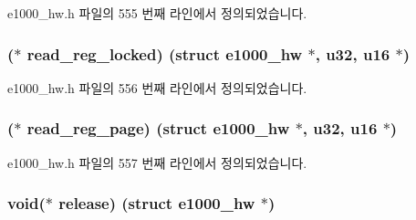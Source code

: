 e1000\+\_\+hw.\+h 파일의 555 번째 라인에서 정의되었습니다.

\subsubsection[{\texorpdfstring{read\+\_\+reg\+\_\+locked}{read_reg_locked}}]{($\ast$ read\+\_\+reg\+\_\+locked) (struct {\bf e1000\+\_\+hw} $\ast$, {\bf u32}, {\bf u16} $\ast$)}\hypertarget{structe1000__phy__operations_ab13c897f42cd1f5047442afb74a848db}{}\label{structe1000__phy__operations_ab13c897f42cd1f5047442afb74a848db}


e1000\+\_\+hw.\+h 파일의 556 번째 라인에서 정의되었습니다.

\subsubsection[{\texorpdfstring{read\+\_\+reg\+\_\+page}{read_reg_page}}]{($\ast$ read\+\_\+reg\+\_\+page) (struct {\bf e1000\+\_\+hw} $\ast$, {\bf u32}, {\bf u16} $\ast$)}\hypertarget{structe1000__phy__operations_a9d7027e7ea07b9dda55cf8864bbd0e6a}{}\label{structe1000__phy__operations_a9d7027e7ea07b9dda55cf8864bbd0e6a}


e1000\+\_\+hw.\+h 파일의 557 번째 라인에서 정의되었습니다.

\subsubsection[{\texorpdfstring{release}{release}}]{\setlength{\rightskip}{0pt plus 5cm}void($\ast$ release) (struct {\bf e1000\+\_\+hw} $\ast$)}\hypertarget{structe1000__phy__operations_a057bf49d5a21aeee7fcfd364257cb772}{}\label{structe1000__phy__operations_a057bf49d5a21aeee7fcfd364257cb772}


